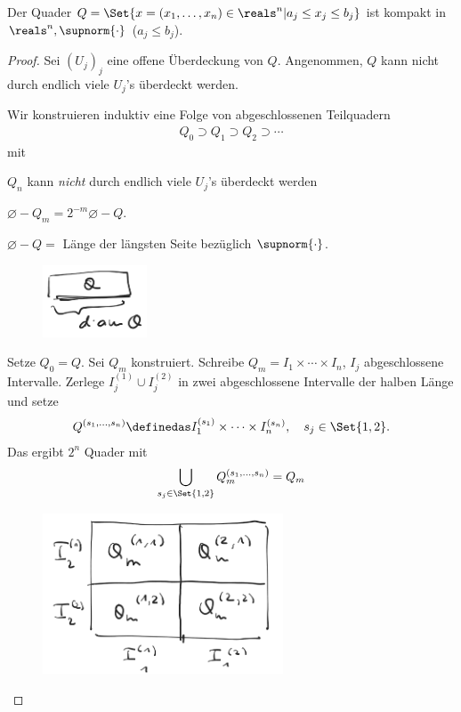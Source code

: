 \begin{lemma}\label{quader_ist_kompakt_norm_undendlich}
    Der Quader \( Q=\Set{x=(x_1,\dotsc, x_n)\in \reals^n| a_j\leq x_j\leq b_j} \) ist kompakt in \( \reals^n,\supnorm{\cdot} \) (\( a_j\leq b_j \)).
\end{lemma}
\begin{proof}
    Sei \( (U_j)_j \) eine offene Überdeckung von \( Q \). Angenommen, \( Q \) kann nicht durch endlich viele \( U_j \)'s überdeckt werden.

    Wir konstruieren induktiv eine Folge von abgeschlossenen Teilquadern
    \begin{align*}
        Q_0\supset Q_1\supset Q_2\supset \dotsb
    \end{align*}
    mit
    \begin{eigenschaftenenumerate}
        \item \( Q_n \) kann \emph{nicht} durch endlich viele \( U_j \)'s überdeckt werden
        \item \( \diameter-{Q_m}=2^{-m}\diameter-{Q} \).
    \end{eigenschaftenenumerate}
     \( \diameter-{Q}= \) Länge der längsten Seite bezüglich \( \supnorm{\cdot} \).
    \begin{figure}[H]
        \centering
        \includegraphics[width=0.3\linewidth]{figures/diameter_quader_norm_unendlich}
        \label{fig:diameter_quader_norm_unendlich}
    \end{figure}
    Setze \( Q_0=Q \). Sei \( Q_m \) konstruiert. Schreibe \( Q_m=I_1\times\dotsb\times I_n \), \( I_j \) abgeschlossene Intervalle. Zerlege \( I_j^{(1)}\cup I_j^{(2)} \) in zwei abgeschlossene Intervalle der halben Länge und setze
    \begin{align*}
        Q^{(s_1,\dotsc,s_n)}\definedas I_1^{(s_1)}\times\dotsb\times I_n^{(s_n)},\quad s_j\in \Set{1,2}.
    \end{align*}
    Das ergibt \( 2^n \) Quader mit
    \begin{align*}
        \bigcup_{s_j\in \Set{1,2}}Q_m^{(s_1,\dotsc,s_n)}=Q_m
    \end{align*}
    \begin{figure}[H]
        \centering
        \includegraphics[width=0.5\linewidth]{figures/teilquader}

\end{figure}
\end{proof}
